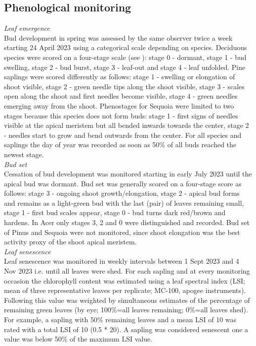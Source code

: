 \documentclass{article}
\begin{document}
	
	\subsection*{Phenological monitoring}
		\textit{Leaf emergence} \\
	Bud development in spring was assessed by the same observer twice a week starting 24 April 2023 using a categorical scale depending on species. Deciduous species were scored on a four-stage scale (see \citep{vitasseElevationalAdaptationPlasticity2013a}): stage 0 - dormant, stage 1 - bud swelling, stage 2 - bud burst, stage 3 - leaf-out and stage 4 - leaf unfolded. Pine saplings were scored differently as follows: stage 1 - swelling or elongation of shoot visible, stage 2 - green needle tips along the shoot visible, stage 3 - scales open along the shoot and first needles become visible, stage 4 - green needles emerging away from the shoot. Phenostages for Sequoia were limited to two stages because this species does not form buds: stage 1 - first signs of needles visible at the apical meristem but all bended inwards towards the center, stage 2 - needles start to grow and bend outwards from the center.
	For all species and saplings the day of year was recorded as soon as 50\% of all buds reached the newest stage. \\
	
		\textit{Bud set} \\
		Cessation of bud development was monitored starting in early July 2023 until the apical bud was dormant. Bud set was generally scored on a four-stage score as follows: stage 3 - ongoing shoot growth/elongation, stage 2 - apical bud forms and remains as a light-green bud with the last (pair) of leaves remaining small, stage 1 - first bud scales appear, stage 0 - bud turns dark red/brown and hardens. In Acer only stages 3, 2 and 0 were distinguished and recorded. Bud set of Pinus and Sequoia were not monitored, since shoot elongation was the best activity proxy of the shoot apical meristem.\\
		
		\textit{Leaf senescence} \\
		Leaf senescence was monitored in weekly intervals between 1 Sept 2023 and 4 Nov 2023 i.e. until all leaves were shed. For each sapling and at every monitoring occasion the chlorophyll content was estimated using a leaf spectral index (LSI; mean of three representative leaves per replicate; MC-100, apogee instruments). Following  \citep{zohner} this value was weighted by simultaneous estimates of the percentage of remaining green leaves (by eye; 100\%=all leaves remaining; 0\%=all leaves shed). For example, a sapling with 50\% remaining leaves and a mean LSI of 10 was rated with a total LSI of 10 (0.5 * 20). A sapling was considered senescent one a value was below 50\% of the maximum LSI value. \\
		
\end{document}
